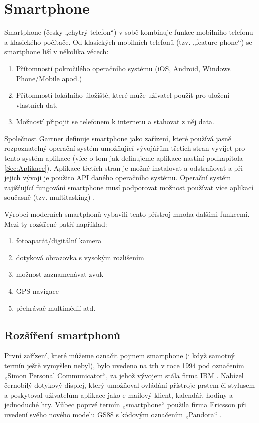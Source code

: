 \section{Smartphone}
Smartphone (česky „chytrý telefon“) v sobě kombinuje funkce mobilního telefonu a klasického počítače. Od klasických mobilních telefonů (tzv. „feature phone“) se smartphone liší v několika věcech:

\begin{enumerate}
	\item Přítomností pokročilého operačního systému (iOS, Android, Windows Phone/Mobile apod.)
	\item Přítomností lokálního úložiště, které může uživatel použít pro uložení vlastních dat.
	\item Možností připojit se telefonem k internetu a stahovat z něj data.
\end{enumerate}

Společnost Gartner definuje smartphone jako zařízení, které používá jasně rozpoznatelný operační systém umožňující vývojářům třetích stran vyvíjet pro tento systém aplikace (více o tom jak definujeme aplikace nastíní podkapitola \ref{Sec:Aplikace}). Aplikace třetích stran je možné instalovat a odstraňovat a při jejich vývoji je použito API daného operačního systému. Operační systém zajišťující fungování smartphone musí podporovat možnost používat více aplikací současně (tzv. multitasking) \cite{gartner_smartphone_definition}. 

Výrobci moderních smartphonů vybavili tento přístroj mnoha dalšími funkcemi. Mezi ty rozšířené patří například:

\begin{enumerate}
	\item fotoaparát/digitální kamera
	\item dotyková obrazovka s vysokým rozlišením
	\item možnost zaznamenávat zvuk
	\item GPS navigace
	\item přehrávač multimédií atd.
\end{enumerate}

\subsection{Rozšíření smartphonů}
První zařízení, které můžeme označit pojmem smartphone (i když samotný termín ještě vymyšlen nebyl), bylo uvedeno na trh v roce 1994 pod označením „Simon Personal Communicator“, za jehož vývojem stála firma IBM \cite{simon}. Nabízel černobílý dotykový displej, který umožňoval ovládání přístroje prstem či stylusem a poskytoval uživatelům aplikace jako e-mailový klient, kalendář, hodiny a jednoduché hry. Vůbec poprvé termín „smartphone“ použila firma Ericsson při uvedení svého nového modelu GS88 s kódovým označením „Pandora“ \cite{history_of_the_smartphone}.

